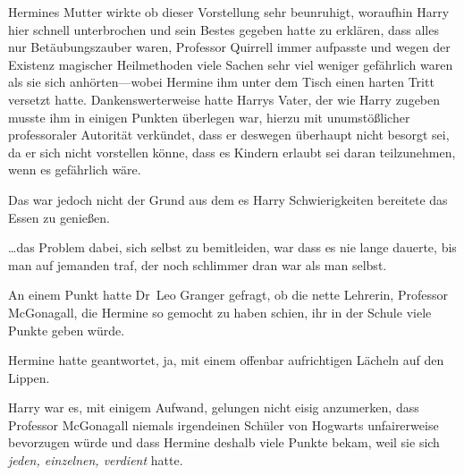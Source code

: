 Hermines Mutter wirkte ob dieser Vorstellung sehr beunruhigt, woraufhin Harry hier schnell unterbrochen und sein Bestes gegeben hatte zu erklären, dass alles nur Betäubungszauber waren, Professor Quirrell immer aufpasste und wegen der Existenz magischer Heilmethoden viele Sachen sehr viel weniger gefährlich waren als sie sich anhörten—wobei Hermine ihm unter dem Tisch einen harten Tritt versetzt hatte. Dankenswerterweise hatte Harrys Vater, der wie Harry zugeben musste ihm in einigen Punkten überlegen war, hierzu mit unumstößlicher professoraler Autorität verkündet, dass er deswegen überhaupt nicht besorgt sei, da er sich nicht vorstellen könne, dass es Kindern erlaubt sei daran teilzunehmen, wenn es gefährlich wäre.

Das war jedoch nicht der Grund aus dem es Harry Schwierigkeiten bereitete das Essen zu genießen.

…das Problem dabei, sich selbst zu bemitleiden, war dass es nie lange dauerte, bis man auf jemanden traf, der noch schlimmer dran war als man selbst.

An einem Punkt hatte Dr~Leo Granger gefragt, ob die nette Lehrerin, Professor McGonagall, die Hermine so gemocht zu haben schien, ihr in der Schule viele Punkte geben würde.

Hermine hatte geantwortet, ja, mit einem offenbar aufrichtigen Lächeln auf den Lippen.

Harry war es, mit einigem Aufwand, gelungen nicht eisig anzumerken, dass Professor McGonagall niemals irgendeinen Schüler von Hogwarts unfairerweise bevorzugen würde und dass Hermine deshalb viele Punkte bekam, weil sie sich \emph{jeden, einzelnen, verdient} hatte.

